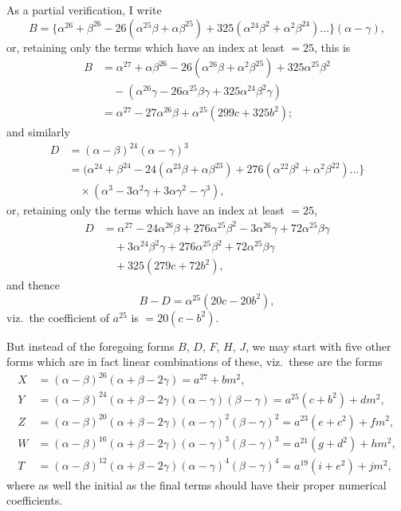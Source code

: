 \documentclass[11pt,a4paper]{book}
\begin{document}
As a partial verification, I write
\[
B = \{\alpha^{26} + \beta^{26} - 26(\alpha^{25}\beta + \alpha\beta^{25}) + 325(\alpha^{24}\beta^2 + \alpha^2\beta^{24}) \ldots\}(\alpha - \gamma),
\]
or, retaining only the terms which have an index at least $= 25$, this is
\begin{align*}
B &= \alpha^{27} + \alpha\beta^{26} - 26(\alpha^{26}\beta + \alpha^2\beta^{25}) + 325\alpha^{25}\beta^2\\
&\quad - (\alpha^{26}\gamma - 26\alpha^{25}\beta\gamma + 325\alpha^{24}\beta^2\gamma)\\
&= \alpha^{27} - 27\alpha^{26}\beta + \alpha^{25}(299c + 325b^2);
\end{align*}
and similarly
\begin{align*}
D &= (\alpha - \beta)^{24}(\alpha - \gamma)^3\\
&= (\alpha^{24} + \beta^{24} - 24(\alpha^{23}\beta + \alpha\beta^{23}) + 276(\alpha^{22}\beta^2 + \alpha^2\beta^{22}) \ldots\}\\
&\quad \times (\alpha^3 - 3\alpha^2\gamma + 3\alpha\gamma^2 - \gamma^3),
\end{align*}
or, retaining only the terms which have an index at least $= 25$,
\begin{align*}
D &= \alpha^{27} - 24\alpha^{26}\beta + 276\alpha^{25}\beta^2 - 3\alpha^{26}\gamma + 72\alpha^{25}\beta\gamma\\
&\quad + 3\alpha^{24}\beta^2\gamma + 276\alpha^{25}\beta^2 + 72\alpha^{25}\beta\gamma\\
&\quad + 325(279c + 72b^2),
\end{align*}
and thence
\[
B - D = \alpha^{25}(20c - 20b^2),
\]
viz.\ the coefficient of $a^{25}$ is $= 20(c - b^2)$.

But instead of the foregoing forms $B$, $D$, $F$, $H$, $J$, we may start with five other forms which are in fact linear combinations of these, viz.\ these are the forms
\begin{align*}
X &= (\alpha - \beta)^{26}(\alpha + \beta - 2\gamma) = a^{27} + bm^2,\\
Y &= (\alpha - \beta)^{24}(\alpha + \beta - 2\gamma)(\alpha - \gamma)(\beta - \gamma) = a^{25}(c + b^2) + dm^2,\\
Z &= (\alpha - \beta)^{20}(\alpha + \beta - 2\gamma)(\alpha - \gamma)^2(\beta - \gamma)^2 = a^{23}(e + c^2) + fm^2,\\
W &= (\alpha - \beta)^{16}(\alpha + \beta - 2\gamma)(\alpha - \gamma)^3(\beta - \gamma)^3 = a^{21}(g + d^2) + hm^2,\\
T &= (\alpha - \beta)^{12}(\alpha + \beta - 2\gamma)(\alpha - \gamma)^4(\beta - \gamma)^4 = a^{19}(i + e^2) + jm^2,
\end{align*}
where as well the initial as the final terms should have their proper numerical coefficients.
\end{document}
